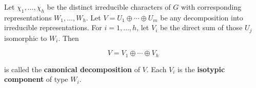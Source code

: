 Let $\chi_1, \ldots, \chi_h$ be the distinct irreducible characters of $G$ with corresponding representations $W_1, \ldots, W_h$. Let $V = U_1 \oplus \cdots \oplus U_m$ be any decomposition into irreducible representations. For $i = 1, \ldots, h$, let $V_i$ be the direct sum of those $U_j$ isomorphic to $W_i$. Then

$$V = V_1 \oplus \cdots \oplus V_h$$

is called the \textbf{canonical decomposition} of $V$. Each $V_i$ is the \textbf{isotypic component} of type $W_i$.
